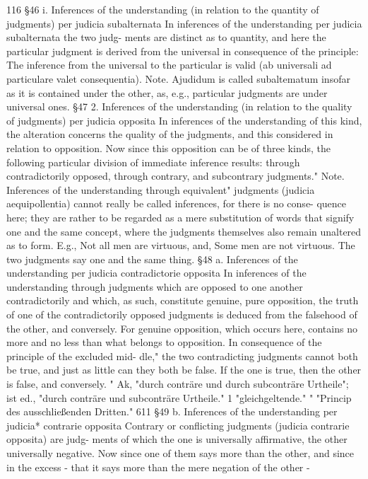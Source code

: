 116
§46
i. Inferences of the understanding (in relation to the quantity of
judgments) per judicia subalternata
In inferences of the understanding per judicia subalternata the two judg-
ments are distinct as to quantity, and here the particular judgment is
derived from the universal in consequence of the principle: The inference
from the universal to the particular is valid (ab universali ad particulare valet
consequentia).
Note.
Ajudidum is called subaltematum insofar as it is contained under the other,
as, e.g., particular judgments are under universal ones.
§47
2. Inferences of the understanding (in relation to the quality of
judgments) per judicia opposita
In inferences of the understanding of this kind, the alteration concerns
the quality of the judgments, and this considered in relation to opposition.
Now since this opposition can be of three kinds, the following particular
division of immediate inference results: through contradictorily opposed,
through contrary, and subcontrary judgments."
Note.
Inferences of the understanding through equivalent" judgments (judicia
aequipollentia) cannot really be called inferences, for there is no conse-
quence here; they are rather to be regarded as a mere substitution of words
that signify one and the same concept, where the judgments themselves
also remain unaltered as to form. E.g., Not all men are virtuous, and, Some
men are not virtuous. The two judgments say one and the same thing.
§48
a. Inferences of the understanding per judicia contradictorie
opposita
In inferences of the understanding through judgments which are opposed
to one another contradictorily and which, as such, constitute genuine,
pure opposition, the truth of one of the contradictorily opposed judgments
is deduced from the falsehood of the other, and conversely. For genuine
opposition, which occurs here, contains no more and no less than what
belongs to opposition. In consequence of the principle of the excluded mid-
dle," the two contradicting judgments cannot both be true, and just as little
can they both be false. If the one is true, then the other is false, and
conversely.
" Ak, "durch conträre und durch subconträre Urtheile"; ist ed., "durch conträre und
subconträre Urtheile."
1
"gleichgeltende."
" "Princip des ausschließenden Dritten."
611
§49
b. Inferences of the understanding per judicia* contrarie opposita
Contrary or conflicting judgments (judicia contrarie opposita) are judg-
ments of which the one is universally affirmative, the other universally
negative. Now since one of them says more than the other, and since in
the excess - that it says more than the mere negation of the other -

